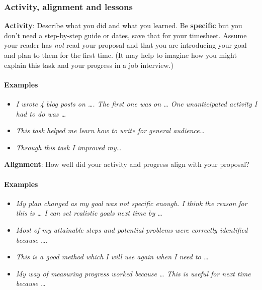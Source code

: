 \documentclass[
  openany]{book}
\providecommand{\tightlist}{%
  \setlength{\itemsep}{0pt}\setlength{\parskip}{0pt}}
\begin{document}
\hypertarget{activity-alignment-and-lessons}{%
\subsubsection{Activity, alignment and lessons}\label{activity-alignment-and-lessons}}

\textbf{Activity}: Describe what you did and what you learned. Be \textbf{specific} but you don't need a step-by-step guide or dates, save that for your timesheet. Assume your reader has \emph{not} read your proposal and that you are introducing your goal and plan to them for the first time. (It may help to imagine how you might explain this task and your progress in a job interview.)

\hypertarget{examples}{%
\paragraph{Examples}\label{examples}}

\begin{itemize}
\tightlist
\item
  \emph{I wrote 4 blog posts on \ldots. The first one was on \ldots{} One unanticipated activity I had to do was \ldots{}}\\
\item
  \emph{This task helped me learn how to write for general audience\ldots{}}\\
\item
  \emph{Through this task I improved my\ldots{}}
\end{itemize}

\textbf{Alignment}: How well did your activity and progress align with your proposal?

\hypertarget{examples-1}{%
\paragraph{Examples}\label{examples-1}}

\begin{itemize}
\tightlist
\item
  \emph{My plan changed as my goal was not specific enough. I think the reason for this is \ldots{} I can set realistic goals next time by \ldots{}}\\
\item
  \emph{Most of my attainable steps and potential problems were correctly identified because \ldots.}\\
\item
  \emph{This is a good method which I will use again when I need to \ldots{}}\\
\item
  \emph{My way of measuring progress worked because \ldots{} This is useful for next time because \ldots{}}
\end{itemize}
\end{document}
